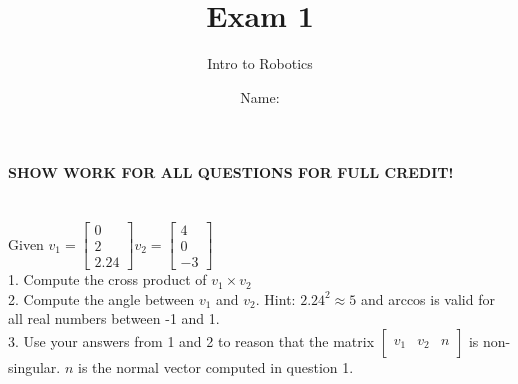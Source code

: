 \documentclass{article}
\title{Exam 1}
\author{Intro to Robotics}
\date{Name: }
\begin{document}
\maketitle
\textbf{SHOW WORK FOR ALL QUESTIONS FOR FULL CREDIT!}
\section{}
Given $v_1=\begin{bmatrix}
0  \\
2   \\
2.24
\end{bmatrix} 
v_2=\begin{bmatrix}
4  \\
0   \\
-3
\end{bmatrix}$\\
1. Compute the cross product of $v_1 \times v_2$\\
2. Compute the angle between $v_1$ and $v_2$. Hint: $2.24^2 \approx 5$ and arccos is valid for all real numbers between -1 and 1.\\
3. Use your answers from 1 and 2 to reason that the matrix $\begin{bmatrix}
& & \\
v_1 & v_2 & n\\
& &
\end{bmatrix}$ is non-singular. $n$ is the normal vector computed in question 1.
\newpage
\end{document}
